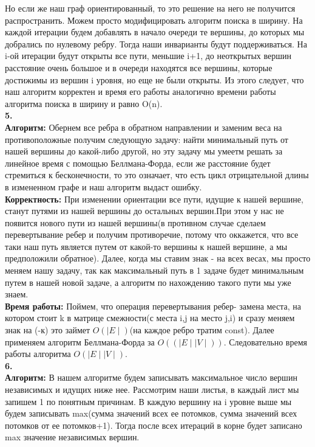 \documentclass[a4paper,12pt]{article}
\begin{document}
Но если же наш граф ориентированный, то это решение на него не получится распространить. Можем просто модифицировать алгоритм поиска в ширину. На каждой итерации будем добавлять в начало очереди те вершины, до которых мы добрались по нулевому ребру. Тогда наши инварианты будут поддерживаться. На i-ой итерации будут открыты все пути, меньшие i+1, до неоткрытых вершин расстояние очень большое и в очереди находятся все вершины, которые достижимы из вершин i уровня, но еще не были открыты. Из этого следует, что наш алгоритм корректен и время его работы аналогично времени работы алгоритма поиска в ширину и равно O(n).\\
\textbf{5.}\\
\textbf{Алгоритм:} Обернем все ребра в обратном направлении и заменим веса на противоположные получим следующую задачу: найти минимальный путь от нашей вершины до какой-либо другой, но эту задачу мы умеетм решать за линейное время с помощью Беллмана-Форда, если же расстояние будет стремиться к бесконечности, то это означает, что есть цикл отрицательной длины в измененном графе и наш алгоритм выдаст ошибку.\\
\textbf{Корректность:} При изменении ориентации все пути, идущие к нашей вершине, станут путями из нашей вершины до остальных вершин.При этом у нас не появится нового пути из нашей вершины(в противном случае сделаем перевертывание ребер и получим противоречие, потому что оккажется, что все таки наш путь является путем от какой-то вершины к нашей вершине, а мы предположили обратное). Далее, когда мы ставим знак - на всех весах, мы просто меняем нашу задачу, так как максимальный путь в 1 задаче будет минимальным путем в нашей новой задаче, а алгоритм по нахождению такого пути мы уже знаем.\\
\textbf{Время работы:} Поймем, что операция перевертывания ребер-  замена места, на котором стоит k в матрице смежности(с места i,j на место j,i)  и сразу меняем знак на (-к) это займет $O(\mid E \mid )$(на каждое ребро тратим const). Далее применяем алгоритм Беллмана-Форда за $O((\mid E \mid \mid V \mid ))$. Следовательно время работы алгоритма $O(\mid E \mid \mid V \mid)$.\\
\textbf{6.}\\
\textbf{Алгоритм:} В нашем алгоритме будем записывать максимальное число вершин независимых и идущих ниже нее. Рассмотрим наши листья, в каждый лист мы запишем 1 по понятным причинам. В каждую вершину на i уровне выше мы будем записывать max(сумма значений всех ее потомков, сумма значений всех потомков от ее потомков+1). Тогда после всех итераций в корне будет записано max значение независимых вершин.\\
\end{document}
